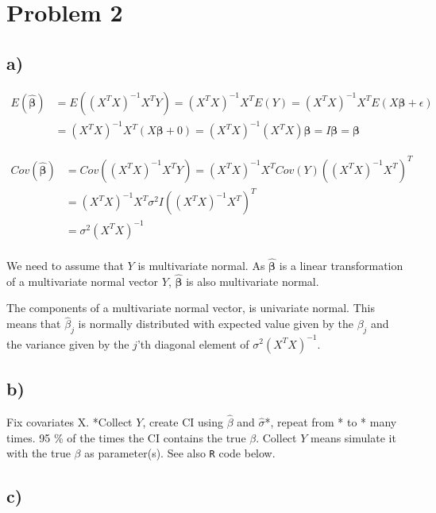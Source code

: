 \documentclass[]{article}
\begin{document}
\section{Problem 2}\label{problem-2}

\subsection{a)}\label{a}

\begin{align}
E(\hat{\boldsymbol\beta})&=E((X^T X)^{-1}X^T Y)=(X^TX)^{-1}X^T E(Y) =(X^TX)^{-1}X^T E(X \boldsymbol\beta +\epsilon) \\
&=(X^TX)^{-1}X^T (X \boldsymbol\beta +0)=(X^TX)^{-1}(X^T X) \boldsymbol\beta = I \boldsymbol\beta = \boldsymbol\beta
\end{align}

\begin{align}
Cov(\hat{\boldsymbol\beta})&=Cov((X^T X)^{-1}X^T Y)=(X^TX)^{-1}X^T Cov(Y)((X^TX)^{-1}X^T)^T \\
&=(X^TX)^{-1}X^T \sigma^2  I ((X^TX)^{-1}X^T)^T\\
&=\sigma^2 (X^TX)^{-1} \\
\end{align}

We need to assume that \(Y\) is multivariate normal. As
\(\hat{\boldsymbol\beta}\) is a linear transformation of a multivariate
normal vector \(Y\), \(\hat{\boldsymbol\beta}\) is also multivariate
normal.

The components of a multivariate normal vector, is univariate normal.
This means that \(\hat{\beta}_j\) is normally distributed with expected
value given by the \(\beta_j\) and the variance given by the \(j\)'th
diagonal element of \(\sigma^2 (X^T X)^{-1}\).

\subsection{b)}\label{b}

Fix covariates X. *Collect \(Y\), create CI using \(\hat{\beta}\) and
\(\hat{\sigma}\)*, repeat from * to * many times. 95 \% of the times the
CI contains the true \(\beta\). Collect \(Y\) means simulate it with the
true \(\beta\) as parameter(s). See also \texttt{R} code below.

\subsection{c)}\label{c}
\end{document}

